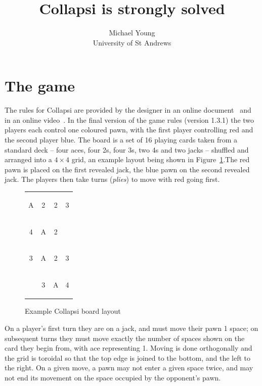 \documentclass[a4paper, twocolumn]{article}
\title{Collapsi is strongly solved}
\author{Michael Young\\University of St Andrews}
\newcommand\card[1]{\begin{tcolorbox}#1\end{tcolorbox}}
\newcommand\redpawn{{\LARGE{\textcolor{red}{\usym{2659}}}}}
\newcommand\bluepawn{{\LARGE{\textcolor{blue}{\usym{2659}}}}}
\newcommand\board[8]{
  \setlength{\tabcolsep}{0.1cm}
  \begin{tabular}{c c c c}
    \card{#1} & \card{#2} & \card{#3} & \card{#4} \\
    \card{#5} & \card{#6} & \card{#7} & \card{#8} \\
    \boardmore
}
\newcommand\boardmore[8]{
    \card{#1} & \card{#2} & \card{#3} & \card{#4} \\
    \card{#5} & \card{#6} & \card{#7} & \card{#8}
  \end{tabular}
}
\begin{document}
\maketitle



\section{The game}

The rules for Collapsi are provided by the designer in an online
document~\cite{rules} and in an online video~\cite{youtube}. In the final
version of the game rules (version 1.3.1) the two players each control one
coloured pawn, with the first player controlling red and the second player
blue. The
board is a set of 16 playing cards taken from a standard deck -- four aces, four
2s, four 3s, two 4s and two jacks -- shuffled and arranged into a $4\times 4$
grid, an example layout being shown in Figure~\ref{fig:board}.The red pawn is
placed on the first revealed jack, the blue pawn on the second revealed jack.
The players then take turns
(\textit{plies}) to move with red going first.

\begin{figure}[ht]
  \centering
  \board A223 4A2{\redpawn} 3A23 {\bluepawn}3A4
  \caption{Example Collapsi board layout}
  \label{fig:board}
\end{figure}

On a player's first turn they are on a jack, and must move their pawn 1 space;
on subsequent turns they must move exactly the number of spaces shown
on the card they begin from, with ace representing 1. Moving is done
orthogonally and the grid is toroidal so that the top edge is joined to the
bottom, and the left to the right. On a given move, a pawn may not enter a given
space twice, and may not end its movement on the space occupied by the
opponent's pawn.
\end{document}
